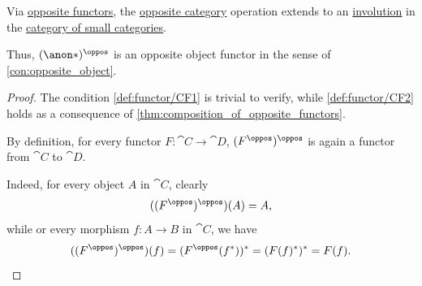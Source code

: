 \begin{proposition}\label{thm:opposite_category_functor}
  Via \hyperref[def:opposite_functor]{opposite functors}, the \hyperref[def:opposite_category]{opposite category} operation extends to an \hyperref[def:categorical_involution]{involution} in the \hyperref[def:category_of_small_categories]{category of small categories}.
\end{proposition}
\begin{comments}
  \item Thus, \( (\anon*)^\oppos \) is an opposite object functor in the sense of \cref{con:opposite_object}.
\end{comments}
\begin{proof}
   The condition \ref{def:functor/CF1} is trivial to verify, while \ref{def:functor/CF2} holds as a consequence of \cref{thm:composition_of_opposite_functors}.

   By definition, for every functor \( F: \cat{C} \to \cat{D} \), \( (F^\oppos)^\oppos \) is again a functor from \( \cat{C} \) to \( \cat{D} \).

  Indeed, for every object \( A \) in \( \cat{C} \), clearly
  \begin{equation*}
    ((F^\oppos)^\oppos)(A) = A,
  \end{equation*}
  while or every morphism \( f: A \to B \) in \( \cat{C} \), we have
  \begin{equation*}
    ((F^\oppos)^\oppos)(f) = (F^\oppos(f^*))^* = (F(f)^*)^* = F(f).
  \end{equation*}
\end{proof}

